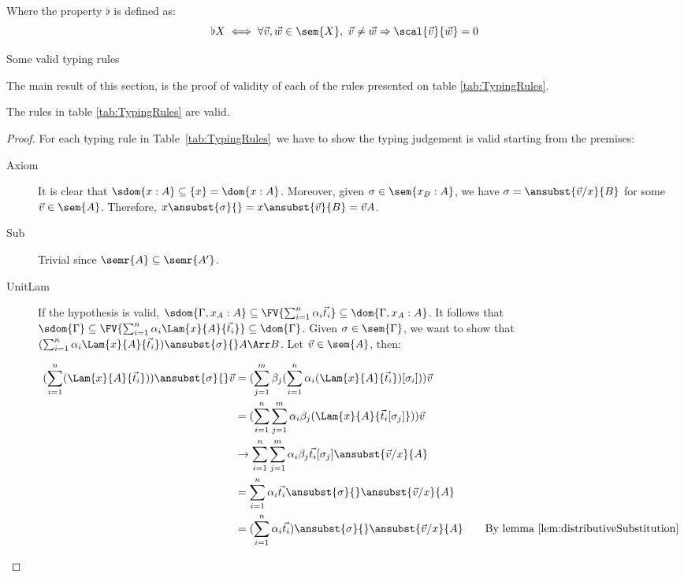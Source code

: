 \begin{table*}
    \parbox{\linewidth}{Where the property $\flat$ is defined as: 
    \[\flat X \iff \forall \vec v, \vec w\in\sem{X}, ~ \vec{v}\neq \vec w \Rightarrow \scal{\vec v}{\vec w} = 0
    \]
    }
    \caption{Some valid typing rules}
    \label{tab:TypingRules}
\end{table*}

The main result of this section, is the proof of validity of each of the rules presented on table \ref{tab:TypingRules}.

\begin{theorem}
    The rules in table \ref{tab:TypingRules} are valid.
\end{theorem}

\begin{proof}
    For each typing rule in Table~\ref{tab:TypingRules}~we have to show the typing judgement is valid starting from the premises:
    \begin{description}
    \item[Axiom] It is clear that $\sdom{x:A}\subseteq\{x\}=\dom{x:A}$. Moreover, given $\sigma\in\sem{x_B:A}$, we have $\sigma=\ansubst{\vec v/x}{B}$ for some $\vec{v}\in\sem{A}$. Therefore, $x\ansubst{\sigma}{}=x\ansubst{\vec v}{B}=\vec{v}\real A$.
    
    \item[Sub] Trivial since $\semr{A}\subseteq\semr{A'}$. 

    \item[UnitLam] If the hypothesis is valid, $\sdom{\Gamma,x_A:A}\subseteq \FV{\sum_{i=1}^{n}\alpha_i \vec t_i}\subseteq \dom{\Gamma,x_A:A}$. It follows that $\sdom{\Gamma}\subseteq \FV{\sum_{i=1}^{n}\alpha_i \Lam{x}{A}{\vec t_i}}\subseteq \dom{\Gamma}$. Given $\sigma\in\sem{\Gamma}$, we want to show that $(\sum_{i=1}^{n}\alpha_i \Lam{x}{A}{\vec t_i})\ansubst{\sigma}{}\real A\Arr B$. Let $\vec v\in\sem{A}$, then:
    
    \begin{align*}
        (\sum_{i=1}^{n} (\Lam{x}{A}{\vec t_i}))\ansubst{\sigma}{} \vec v&= (\sum_{j=1}^{m} \beta_j (\sum_{i=1}^{n} \alpha_i (\Lam{x}{A}{\vec t_i}) [\sigma_i])) \vec{v} \\
        &= (\sum_{i=1}^{n}\sum_{j=1}^{m}\alpha_i\beta_j (\Lam{x}{A}{\vec t_i[\sigma_j]}))\vec v\\
        &\to \sum_{i=1}^{n}\sum_{j=1}^{m}\alpha_i\beta_j \vec{t_i}[\sigma_j]\ansubst{\vec v/x}{A}\\
        &=\sum_{i=1}^{n}\alpha_i \vec{t_i}\ansubst{\sigma}{}\ansubst{\vec v/x}{A}\\
        &=(\sum_{i=1}^{n}\alpha_i \vec{t_i})\ansubst{\sigma}{}\ansubst{\vec v/x}{A}\qquad{\text{By lemma \ref{lem:distributiveSubstitution}}}
    \end{align*}
    

\end{description}
\end{proof}
